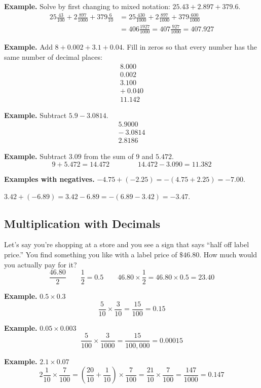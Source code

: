 \documentclass[letter]{article}
\begin{document}
\textbf{Example.} Solve by first changing to mixed notation: $25.43+2.897+379.6$.
\[\begin{aligned}
  25\frac{43}{100}+2\frac{897}{1000}+379\frac6{10}
  &=25\frac{430}{1000}+2\frac{897}{1000}+379\frac{600}{1000}\\
  &=406\frac{1927}{1000}=407\frac{927}{1000}=407.927
\end{aligned}\]

\textbf{Example.} Add $8+0.002+3.1+0.04$. Fill in zeros so that every number has the same number of decimal places:
\[
  \begin{array}{r}8.000\\0.002\\3.100\\+\ 0.040\\\hline11.142\end{array}
\]

\textbf{Example.} Subtract $5.9-3.0814$.
\[
  \begin{array}{r}5.9000\\-\ 3.0814\\\hline2.8186\end{array}
\]

\textbf{Example.} Subtract $3.09$ from the sum of $9$ and $5.472$.
\[9+5.472=14.472\qquad\qquad14.472-3.090=11.382\]

\textbf{Examples with negatives.} $-4.75+(-2.25)=-(4.75+2.25)=-7.00$.

$3.42+(-6.89)=3.42-6.89=-(6.89-3.42)=-3.47$.

\subsection{Multiplication with Decimals}

Let's say you're shopping at a store and you see a sign that says ``half off label price.'' You find something you like with a label price of $\$46.80$. How much would you actually pay for it?
\[\frac{46.80}2\qquad\frac12=0.5\qquad46.80\times\frac12=46.80\times0.5=23.40\]

\textbf{Example.} $0.5\times0.3$
\[\frac5{10}\times\frac3{10}=\frac{15}{100}=0.15\]

\textbf{Example.} $0.05\times0.003$
\[\frac5{100}\times\frac3{1000}=\frac{15}{100{,}000}=0.00015\]

\textbf{Example.} $2.1\times0.07$
\[
  2\frac1{10}\times\frac7{100}=\left(\frac{20}{10}+\frac1{10}\right)\times\frac7{100}=\frac{21}{10}\times\frac7{100}=\frac{147}{1000}=0.147
\]
\end{document}

